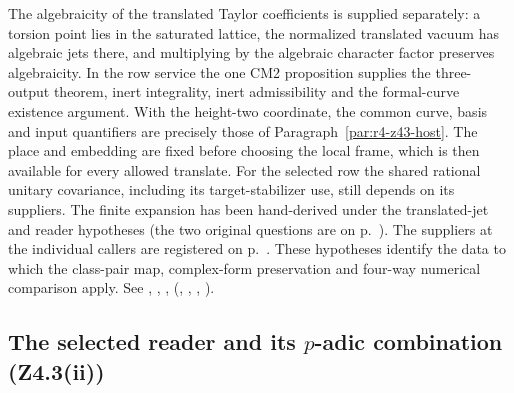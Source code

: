 The algebraicity of the translated Taylor coefficients is supplied
separately: a torsion point lies in the saturated lattice, the
normalized translated vacuum has algebraic jets there, and multiplying
by the algebraic character factor preserves algebraicity. In the row
service the one CM2 proposition supplies the three-output theorem,
inert integrality, inert admissibility and the formal-curve existence
argument. With the height-two coordinate, the common curve, basis
and input quantifiers are precisely those of
Paragraph~\ref{par:r4-z43-host}. The place and embedding are fixed before
choosing the local frame, which is then available for every allowed
translate. For the selected row the shared rational unitary covariance, including its target-stabilizer use, still depends on its suppliers. The finite expansion has been hand-derived under the translated-jet and reader hypotheses (the two original questions are on p.~\pageref{r9:z43-open}). The suppliers at the individual callers are registered on p.~\pageref{r10:z43-register}. These hypotheses identify the data to which the class-pair map, complex-form preservation and four-way numerical comparison apply. See , ,
, 
(, ,
, ).

\subsection{The selected reader and its $p$-adic combination (Z4.3(ii))}
\label{r14:comb-tied}

